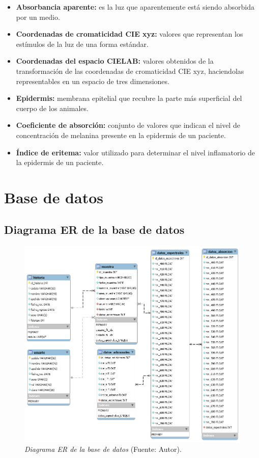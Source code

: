 \begin{itemize}
	\item \textbf{Absorbancia aparente:} es la luz que aparentemente est\'{a} siendo absorbida por un medio.
	
	\item \textbf{Coordenadas de cromaticidad CIE xyz:} valores que representan los est\'{i}mulos de la luz de una forma est\'{a}ndar.
	
	\item \textbf{Coordenadas del espacio CIELAB:} valores obtenidos de la transformaci\'{o}n de las coordenadas de cromaticidad CIE xyz, haciendolas representables en un espacio de tres dimensiones.
	
	\item \textbf{Epidermis:} membrana epitelial que recubre la parte m\'{a}s superficial del cuerpo de los animales.	
	
	\item \textbf{Coeficiente de absorci\'{o}n:} conjunto de valores que indican el nivel de concentraci\'{o}n de melanina presente en la epidermis de un paciente.
	
	\item \textbf{\'{I}ndice de eritema:} valor utilizado para determinar el nivel inflamatorio de la epidermis de un paciente.
	
\end{itemize}

\newpage

\section{Base de datos}

	\subsection{Diagrama ER de la base de datos}

	\begin{figure}[H]
		\centering
		\includegraphics[scale=.4]{img/diagramaER.png}
			\caption[Diagrama ER de la base de datos]{\textit{Diagrama ER de la base de datos} (Fuente: Autor).}
	\end{figure}
	

